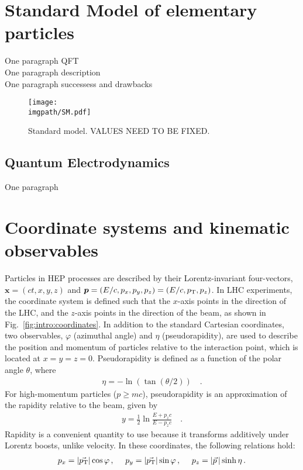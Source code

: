 \def \imgpath {"./figures/intro"}
\section{Standard Model of elementary particles}

One paragraph QFT\\
One paragraph description\\
One paragraph successess and drawbacks

\begin{figure}[H]
\texttt{[image: \\imgpath/SM.pdf]}
\caption{Standard model. VALUES NEED TO BE FIXED.}
\end{figure}

\subsection{Quantum Electrodynamics}

One paragraph

\section{Coordinate systems and kinematic observables}

Particles in HEP processes are described by their Lorentz-invariant four-vectors, $\bm{x} = (ct, x, y, z)$ and $\bm{p} = (E/c, p_x, p_y, p_z) = (E/c, p_{\text{T}}, p_z)$. In LHC experiments, the coordinate system is defined such that the $x$-axis points in the direction of the LHC, and the $z$-axis points in the direction of the beam, as shown in Fig.~\ref{fig:intro:coordinates}. In addition to the standard Cartesian coordinates, two observables, $\varphi$ (azimuthal angle) and $\eta$ (pseudorapidity), are used to describe the position and momentum of particles relative to the interaction point, which is located at $x = y = z = 0$. Pseudorapidity is defined as a function of the polar angle $\theta$, where 
\begin{align}
\eta = -\ln(\tan(\theta/2)) \quad .
\end{align}
For high-momentum particles ($p \geq mc$), pseudorapidity is an approximation of the rapidity relative to the beam, given by 
\begin{align}
y = \frac{1}{2} \ln \frac{E + p_z c}{E - p_z c} \quad .
\end{align}
Rapidity is a convenient quantity to use because it transforms additively under Lorentz boosts, unlike velocity. In these coordinates, the following relations hold:
\begin{align}
p_x = |\vec{p_{\text{T}}}| \cos \varphi \, , \quad \
p_y = |\vec{p_{\text{T}}}| \sin \varphi \, , \quad \
p_z = |\vec{p} \,| \sinh \eta \, .
\end{align}

